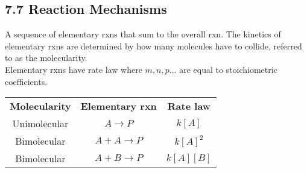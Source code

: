 \subsection{7.7 Reaction Mechanisms}
    A sequence of elementary rxns that sum to the overall rxn. The kinetics of elementary rxns are determined by
    how many molecules have to collide, referred to as the molecularity.\\
    

    Elementary rxns have rate law where $m,n,p\dots$ are equal to stoichiometric coefficients.
    \vspace*{0.5em}
    
    \begin{center}
        \begin{tabular}{ |c|c|c| } 
         \hline
         \textbf{Molecularity} & \textbf{Elementary rxn} & \textbf{Rate law} \\
         Unimolecular & $A \longrightarrow P$ & $k[A]$ \\
         Bimolecular & $A + A \longrightarrow P$ & $k[A]^2$ \\
         Bimolecular & $A + B \longrightarrow P$ & $k[A][B]$ \\
         \hline
        \end{tabular}
    \end{center}